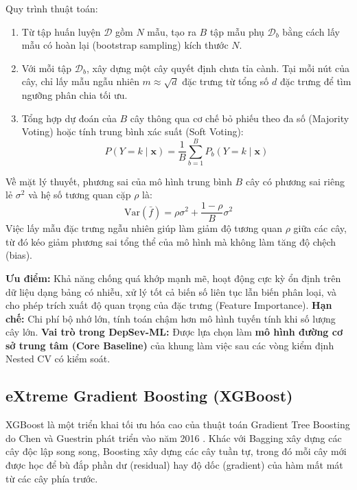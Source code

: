 Quy trình thuật toán:
\begin{enumerate}
    \item Từ tập huấn luyện $\mathcal{D}$ gồm $N$ mẫu, tạo ra $B$ tập mẫu phụ $\mathcal{D}_b$ bằng cách lấy mẫu có hoàn lại (bootstrap sampling) kích thước $N$.
    \item Với mỗi tập $\mathcal{D}_b$, xây dựng một cây quyết định chưa tỉa cành. Tại mỗi nút của cây, chỉ lấy mẫu ngẫu nhiên $m \approx \sqrt{d}$ đặc trưng từ tổng số $d$ đặc trưng để tìm ngưỡng phân chia tối ưu.
    \item Tổng hợp dự đoán của $B$ cây thông qua cơ chế bỏ phiếu theo đa số (Majority Voting) hoặc tính trung bình xác suất (Soft Voting):
    \begin{equation}
        P(Y = k \mid \mathbf{x}) = \frac{1}{B} \sum_{b=1}^B P_b(Y = k \mid \mathbf{x})
    \end{equation}
\end{enumerate}

Về mặt lý thuyết, phương sai của mô hình trung bình $B$ cây có phương sai riêng lẻ $\sigma^2$ và hệ số tương quan cặp $\rho$ là:
\begin{equation}
    \text{Var}(\bar{f}) = \rho \sigma^2 + \frac{1 - \rho}{B} \sigma^2
\end{equation}
Việc lấy mẫu đặc trưng ngẫu nhiên giúp làm giảm độ tương quan $\rho$ giữa các cây, từ đó kéo giảm phương sai tổng thể của mô hình mà không làm tăng độ chệch (bias).

\textbf{Ưu điểm:} Khả năng chống quá khớp mạnh mẽ, hoạt động cực kỳ ổn định trên dữ liệu dạng bảng có nhiễu, xử lý tốt cả biến số liên tục lẫn biến phân loại, và cho phép trích xuất độ quan trọng của đặc trưng (Feature Importance).  
\textbf{Hạn chế:} Chi phí bộ nhớ lớn, tính toán chậm hơn mô hình tuyến tính khi số lượng cây lớn.  
\textbf{Vai trò trong DepSev-ML:} Được lựa chọn làm \textbf{mô hình đường cơ sở trung tâm (Core Baseline)} của khung làm việc sau các vòng kiểm định Nested CV có kiểm soát.

\subsection{eXtreme Gradient Boosting (XGBoost)}
XGBoost là một triển khai tối ưu hóa cao của thuật toán Gradient Tree Boosting do Chen và Guestrin phát triển vào năm 2016 \cite{chen2016xgboost}. Khác với Bagging xây dựng các cây độc lập song song, Boosting xây dựng các cây tuần tự, trong đó mỗi cây mới được học để bù đắp phần dư (residual) hay độ dốc (gradient) của hàm mất mát từ các cây phía trước.

